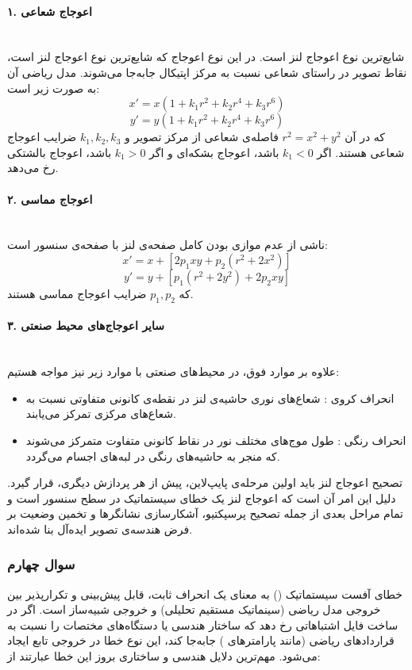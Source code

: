 \documentclass{article}
\begin{document}
\paragraph{۱. اعوجاج شعاعی }\mbox{}\\

شایع‌ترین نوع اعوجاج لنز است. در این نوع اعوجاج که شایع‌ترین نوع اعوجاج لنز است، نقاط تصویر در راستای شعاعی نسبت به مرکز اپتیکال جابه‌جا می‌شوند. مدل ریاضی آن به صورت زیر است:
\[
    x' = x(1 + k_1 r^2 + k_2 r^4 + k_3 r^6)
\]
\[
    y' = y(1 + k_1 r^2 + k_2 r^4 + k_3 r^6)
\]
که در آن $r^2 = x^2 + y^2$ فاصله‌ی شعاعی از مرکز تصویر و $k_1, k_2, k_3$ ضرایب اعوجاج شعاعی هستند. اگر $k_1 < 0$ باشد، اعوجاج بشکه‌ای  و اگر $k_1 > 0$ باشد، اعوجاج بالشتکی  رخ می‌دهد.
\paragraph{۲. اعوجاج مماسی }\mbox{}\\
ناشی از عدم موازی بودن کامل صفحه‌ی لنز با صفحه‌ی سنسور است:
\[
    x' = x + \left[2p_1 xy + p_2(r^2 + 2x^2)\right]
\]
\[
    y' = y + \left[p_1(r^2 + 2y^2) + 2p_2 xy\right]
\]
که $p_1, p_2$ ضرایب اعوجاج مماسی هستند.

\paragraph{۳. سایر اعوجاج‌های محیط صنعتی}\mbox{}\\
علاوه بر موارد فوق، در محیط‌های صنعتی با موارد زیر نیز مواجه هستیم:
\begin{itemize}
\item انحراف کروی : شعاع‌های نوری حاشیه‌ی لنز در نقطه‌ی کانونی متفاوتی نسبت به شعاع‌های مرکزی تمرکز می‌یابند.
\item 
انحراف رنگی : طول موج‌های مختلف نور در نقاط کانونی متفاوت متمرکز می‌شوند که منجر به حاشیه‌های رنگی در لبه‌های اجسام می‌گردد.
\end{itemize}



تصحیح اعوجاج لنز باید اولین مرحله‌ی پایپ‌لاین، پیش از هر پردازش دیگری، قرار گیرد. دلیل این امر آن است که اعوجاج لنز یک خطای سیستماتیک در سطح سنسور است و تمام مراحل بعدی از جمله تصحیح پرسپکتیو، آشکارسازی نشانگرها  و تخمین وضعیت  بر فرض هندسه‌ی تصویر ایده‌آل بنا شده‌اند.

\subsubsection{سوال چهارم}
خطای آفست سیستماتیک () به معنای یک انحراف ثابت، قابل پیش‌بینی و تکرارپذیر بین خروجی مدل ریاضی (سینماتیک مستقیم تحلیلی) و خروجی شبیه‌ساز است. اگر در ساخت فایل  اشتباهاتی رخ دهد که ساختار هندسی یا دستگاه‌های مختصات را نسبت به قراردادهای ریاضی (مانند پارامترهای ) جابه‌جا کند، این نوع خطا در خروجی تابع  ایجاد می‌شود. مهم‌ترین دلایل هندسی و ساختاری بروز این خطا عبارتند از:
\end{document}
